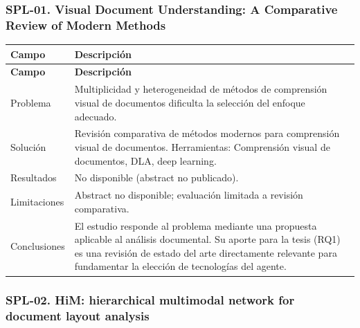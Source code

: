 \subsubsection*{SPL-01. Visual Document Understanding: A Comparative Review of Modern Methods}

\begin{longtable}{@{}>{\raggedright\arraybackslash}p{}>{\raggedright\arraybackslash}p{}@{}}
\toprule
\textbf{Campo} & \textbf{Descripción} \\
\midrule
\endfirsthead
\toprule
\textbf{Campo} & \textbf{Descripción} \\
\midrule
\endhead
\bottomrule
\endfoot
\endlastfoot
Problema & Multiplicidad y heterogeneidad de métodos de comprensión visual de documentos dificulta la selección del enfoque adecuado. \\
Solución & Revisión comparativa de métodos modernos para comprensión visual de documentos. Herramientas: Comprensión visual de documentos, DLA, deep learning. \\
Resultados & No disponible (abstract no publicado). \\
Limitaciones & Abstract no disponible; evaluación limitada a revisión comparativa. \\
Conclusiones & El estudio responde al problema mediante una propuesta aplicable al análisis documental. Su aporte para la tesis (RQ1) es una revisión de estado del arte directamente relevante para fundamentar la elección de tecnologías del agente. \\
\end{longtable}

\subsubsection*{SPL-02. HiM: hierarchical multimodal network for document layout analysis}

